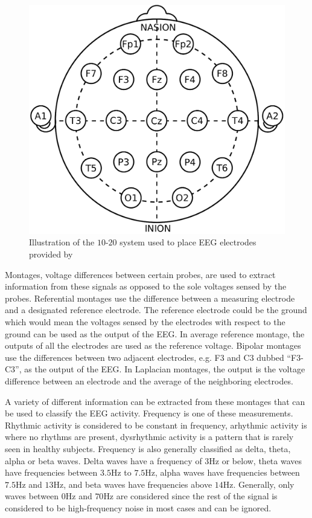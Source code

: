 \begin{figure}[!ht]
	\centering
	\includegraphics[height=0.45\linewidth]{pictures/tentwenty.pdf}
	\caption[Illustration of the $10$-$20$ system]{Illustration of the $10$-$20$ system used to place EEG electrodes provided by \citet{wiki:tentwenty}} \label{fig:tentwenty}
\end{figure}


Montages, voltage differences between certain probes, are used to extract information from these signals as opposed to the sole voltages sensed by the probes. Referential montages use the difference between a measuring electrode and a designated reference electrode. The reference electrode could be the ground which would mean the voltages sensed by the electrodes with respect to the ground can be used as the output of the EEG. In average reference montage, the outputs of all the electrodes are used as the reference voltage. Bipolar montages use the differences between two adjacent electrodes, e.g. F3 and C3 dubbed ``F3-C3'', as the output of the EEG. In Laplacian montages, the output is the voltage difference between an electrode and the average of the neighboring electrodes. 

A variety of different information can be extracted from these montages that can be used to classify the EEG activity. Frequency is one of these measurements. Rhythmic activity is considered to be constant in frequency, arhythmic activity is where no rhythms are present, dysrhythmic activity is a pattern that is rarely seen in healthy subjects. Frequency is also generally classified as delta, theta, alpha or beta waves. Delta waves have a frequency of $3$Hz or below, theta waves have frequencies between $3.5$Hz to $7.5$Hz, alpha waves have frequencies between $7.5$Hz and $13$Hz, and beta waves have frequencies above $14$Hz. Generally, only waves between $0$Hz and $70$Hz are considered since the rest of the signal is considered to be high-frequency noise in most cases and can be ignored.

